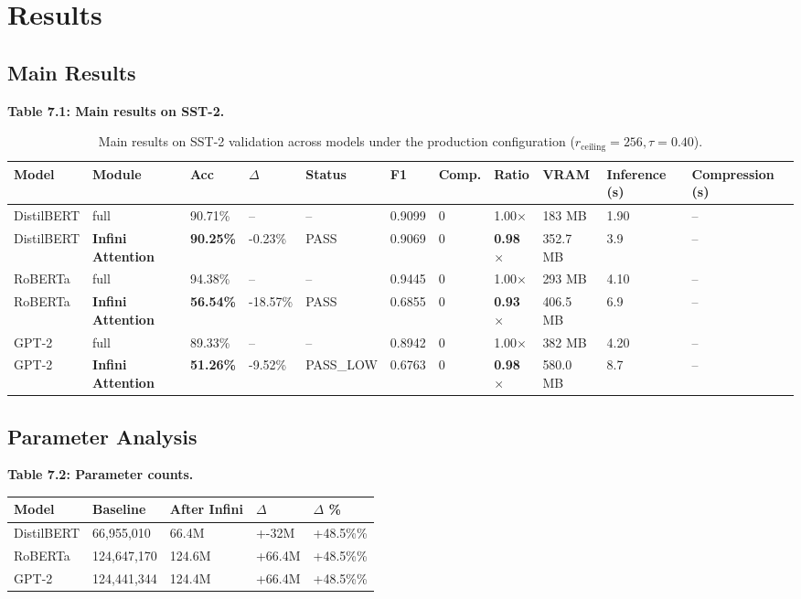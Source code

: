 
\section{Results}

\subsection{Main Results}

\textbf{Table 7.1: Main results on SST-2.}

\begin{table}[t]
\centering
\small
\begin{tabular}{lllllllllll}
\toprule
\textbf{Model} & \textbf{Module} & \textbf{Acc} & \textbf{$\Delta$} & \textbf{Status} & \textbf{F1} & \textbf{Comp.} & \textbf{Ratio} & \textbf{VRAM} & \textbf{Inference (s)} & \textbf{Compression (s)} \\
\midrule
DistilBERT & full & 90.71\% & -- & -- & 0.9099 & 0 & 1.00$\times$ & 183 MB & 1.90 & -- \\
DistilBERT & \textbf{Infini Attention} & \textbf{90.25\%} & -0.23\% & PASS & 0.9069 & 0 & \textbf{0.98$\times$} & 352.7 MB & 3.9 & -- \\
RoBERTa & full & 94.38\% & -- & -- & 0.9445 & 0 & 1.00$\times$ & 293 MB & 4.10 & -- \\
RoBERTa & \textbf{Infini Attention} & \textbf{56.54\%} & -18.57\% & PASS & 0.6855 & 0 & \textbf{0.93$\times$} & 406.5 MB & 6.9 & -- \\
GPT-2 & full & 89.33\% & -- & -- & 0.8942 & 0 & 1.00$\times$ & 382 MB & 4.20 & -- \\
GPT-2 & \textbf{Infini Attention} & \textbf{51.26\%} & -9.52\% & PASS\_LOW & 0.6763 & 0 & \textbf{0.98$\times$} & 580.0 MB & 8.7 & -- \\
\bottomrule
\end{tabular}
\caption{Main results on SST-2 validation across models under the production configuration ($r_{\mathrm{ceiling}}=256, \tau=0.40$).}
\label{tab:main_sst2}
\end{table}

\subsection{Parameter Analysis}

\textbf{Table 7.2: Parameter counts.}

\begin{table}[H]
\centering
\small
\begin{tabular}{lllll}
\toprule
\textbf{Model} & \textbf{Baseline} & \textbf{After Infini} & \textbf{$\Delta$} & \textbf{$\Delta$ \%} \\
\midrule
DistilBERT & 66,955,010 & 66.4M & +-32M & +48.5\%\% \\
RoBERTa & 124,647,170 & 124.6M & +66.4M & +48.5\%\% \\
GPT-2 & 124,441,344 & 124.4M & +66.4M & +48.5\%\% \\
\bottomrule
\end{tabular}
\end{table}

